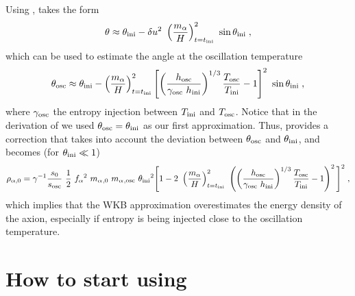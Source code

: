 \documentclass[11pt,a4paper]{article}
\begin{document}
Using ,  takes the form
%
\begin{eqnarray}
	\theta \approx    \thetai - \delta u^2 \ \lrb{\dfrac{\ma}{H}}_{t=\ti}^2 \ \sin \thetai \;,
	\label{eq:theta_du}
\end{eqnarray}
%
which can be used to estimate the angle at the oscillation temperature
%
\begin{eqnarray}
	\theta_{\rm osc} \approx    \theta_{\rm ini}{} -  \left( \dfrac{m_\alpha{}}{H} \right)_{t=t_{\rm ini}{}}^2 \left[  \left( \dfrac{h_{\rm osc}}{\gamma_{\rm osc} \ h_{\rm ini}} \right)^{1/3} \dfrac{T_{\rm osc}}{T_{\rm ini}} -1  \right] ^{2}   \ \sin \theta_{\rm ini}{} \;,
	\label{eq:theta_osc}
\end{eqnarray}
%
where  $\gamma_{\rm osc}$ the entropy injection between $T_{\rm ini}{}$ and $T_{\rm osc}{}$. Notice that in the derivation of  we used $\theta_{\rm osc} = \theta_{\rm ini}{}$ as our first approximation. Thus,  provides a correction that takes into account the deviation between $\theta_{\rm osc} $ and $ \theta_{\rm ini}{}$, and  becomes (for $\theta_{\rm ini}{} \ll 1$)
%
\begin{eqnarray}
	\rho _{\alpha,0} = \gamma^{-1}  \dfrac{s_0}{s_{\rm osc}} \  \dfrac{1 }{2}  \ f_{\alpha}{}^2 \ m_\alpha{}_{,0} \ m_\alpha{}_{,{\rm osc}} \ \theta_{\rm ini}{}^2 \Bigg[ 
		1 -2 \ \left( \dfrac{m_\alpha{}}{H} \right)_{t=t_{\rm ini}{}}^2 \  \left( \left( \dfrac{h_{\rm osc}}{\gamma_{\rm osc} \ h_{\rm ini}} \right)^{1/3} \dfrac{T_{\rm osc}}{T_{\rm ini}}-1  \right) ^{2}    \Bigg]^2    \;,
	\label{eq:rho_a_NLO} 
\end{eqnarray}
%
which implies that the WKB approximation overestimates the energy density of the axion, especially if entropy is being injected close to the oscillation temperature.



\section{How to start using \mimes}\label{sec:start}
\setcounter{equation}{0}
\end{document}
